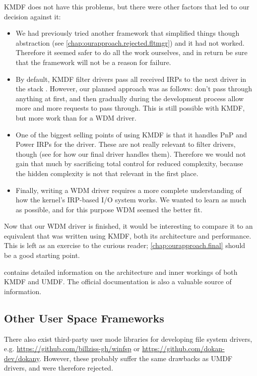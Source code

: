 KMDF does not have this problems, but there were other factors that led to our decision against it:
\begin{itemize}
	\item We had previously tried another framework that simplified things though abstraction (see \autoref{chap:ourapproach.rejected.fltmgr}) and it had not worked. Therefore it seemed safer to do all the work ourselves, and in return be sure that the framework will not be a reason for failure.
	\item By default, KMDF filter drivers pass all received IRPs to the next driver in the stack \cite{Wdf}. However, our planned approach was as follows: don't pass through anything at first, and then gradually during the development process allow more and more requests to pass through. This is still possible with KMDF, but more work than for a WDM driver.
	\item One of the biggest selling points of using KMDF is that it handles PnP and Power IRPs for the driver. These are not really relevant to filter drivers, though (see  for how our final driver handles them). Therefore we would not gain that much by sacrificing total control for reduced complexity, because the hidden complexity is not that relevant in the first place.
	\item Finally, writing a WDM driver requires a more complete understanding of how the kernel's IRP-based I/O system works. We wanted to learn as much as possible, and for this purpose WDM seemed the better fit.
\end{itemize}

Now that our WDM driver is finished, it would be interesting to compare it to an equivalent that was written using KMDF, both its architecture and performance. This is left as an exercise to the curious reader; \autoref{chap:ourapproach.final} should be a good starting point.

\cite{Yosifovich2017} contains detailed information on the architecture and inner workings of both KMDF and UMDF. The official documentation \cite{Wdf} is also a valuable source of information.

\subsection{Other User Space Frameworks}
\label{chap:ourapproach.rejected.other}
There also exist third-party user mode libraries for developing file system drivers, e.g. \url{https://github.com/billziss-gh/winfsp} or \url{https://github.com/dokan-dev/dokany}. However, these probably suffer the same drawbacks as UMDF drivers, and were therefore rejected.

